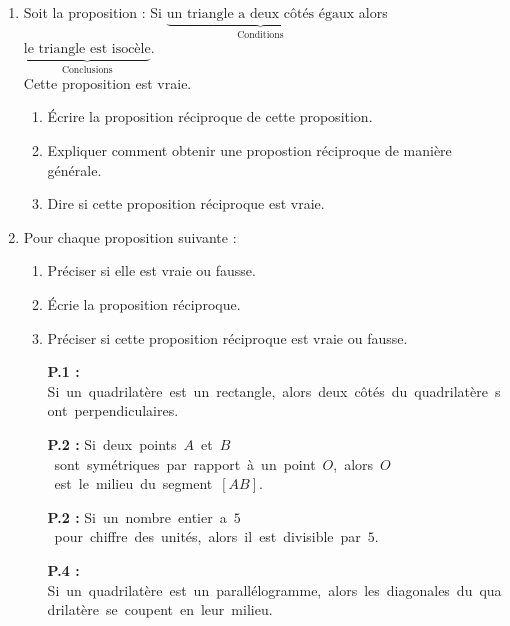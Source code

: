 \begin{activite}
    \begin{enumerate}
        \item Soit la proposition : \og Si $\underbrace{\text{un triangle a deux côtés égaux}}_{\text{Conditions}}$ alors $\underbrace{\text{le triangle est isocèle}}_{\text{Conclusions}}$.\\
        Cette proposition est vraie.
        \begin{enumerate}
            \item Écrire la proposition réciproque de cette proposition.
            \item Expliquer comment obtenir une propostion réciproque de manière générale.
            \item Dire si cette proposition réciproque est vraie.
        \end{enumerate}
        \item Pour chaque proposition suivante :
        \begin{enumerate}
            \item Préciser si elle est vraie ou fausse.
            \item Écrie la proposition réciproque.
            \item Préciser si cette proposition réciproque est vraie ou fausse.
        \end{enumerate}
        \begin{itemize}
            \item[{\bfseries P.1 : }]\mbox{Si un quadrilatère est un rectangle, alors deux côtés du quadrilatère sont perpendiculaires.}
            \item[{\bfseries P.2 : }]\mbox{Si deux points $A$ et $B$ sont symétriques par rapport à un point $O$, alors $O$ est le milieu du segment $[AB]$.}
            \item[{\bfseries P.2 : }]\mbox{Si un nombre entier a $5$ pour chiffre des unités, alors il est divisible par $5$.}
            \item[{\bfseries P.4 : }]\mbox{Si un quadrilatère est un parallélogramme, alors les diagonales du quadrilatère se coupent en leur milieu.}
        \end{itemize}
    \end{enumerate}
\end{activite}
